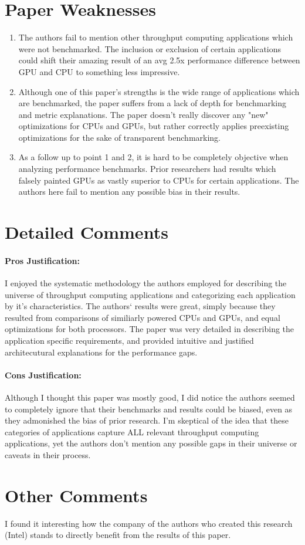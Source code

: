 \documentclass[letterpaper,twocolumn,10pt]{article}
\begin{document}
\section*{Paper Weaknesses}
  \begin{enumerate}
    \item The authors fail to mention other throughput computing
      applications which were not benchmarked. The inclusion or exclusion of
      certain applications could shift their amazing result of
      an avg 2.5x performance difference between GPU and CPU to something
      less impressive.
    \item Although one of this paper's strengths is the wide range of
      applications which are benchmarked, the paper suffers from a lack of depth for
      benchmarking and metric explanations. The paper doesn't really
      discover any "new" optimizations for CPUs and GPUs, but rather
      correctly applies preexisting optimizations for the sake of
      transparent benchmarking.
    \item As a follow up to point 1 and 2, it is hard to be completely
      objective when analyzing performance benchmarks. Prior
      researchers had results which falsely painted GPUs as vastly superior to CPUs
      for certain applications. The authors here fail to mention any
      possible bias in their results.  
  \end{enumerate}
\section*{Detailed Comments}
\paragraph{\bf Pros Justification: }
I enjoyed the systematic methodology the authors employed for describing the
universe of throughput computing applications and categorizing each
application by it's characteristics. The authors` results were great, simply
because they resulted from comparisons of similiarly powered CPUs and GPUs,
and equal optimizations for both processors. The paper was very detailed in
describing the application specific requirements, and provided intuitive and
justified architecutural explanations for the performance gaps. 
\paragraph{\bf Cons Justification: }
Although I thought this paper was mostly good, I did notice the authors
seemed to completely ignore that their benchmarks and results could be
biased, even as they admonished the bias of prior research. I'm skeptical of
the idea that these categories of applications capture ALL relevant
throughput computing applications, yet the authors don't mention any
possible gaps in their universe or caveats in their process.
\section*{Other Comments}
I found it interesting how the company of the authors who created this
research (Intel) stands to directly benefit from the results of this paper.
\pagebreak
\end{document}
